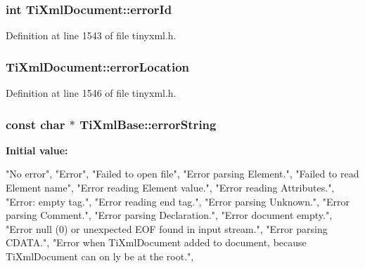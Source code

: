 \hypertarget{classTiXmlDocument_acdef97a4bb80729ac6863dd54cee7eeb}{
\subsubsection[{errorId}]{\setlength{\rightskip}{0pt plus 5cm}int {\bf TiXmlDocument::errorId}}}
\label{df/d09/classTiXmlDocument_acdef97a4bb80729ac6863dd54cee7eeb}


Definition at line 1543 of file tinyxml.h.

\hypertarget{classTiXmlDocument_aa4030f989f1549f6b897147fc2851d1a}{
\subsubsection[{errorLocation}]{ {\bf TiXmlDocument::errorLocation}}}
\label{df/d09/classTiXmlDocument_aa4030f989f1549f6b897147fc2851d1a}


Definition at line 1546 of file tinyxml.h.

\hypertarget{classTiXmlBase_a7ac8feec4100e446b3d78e1ac0659700}{
\subsubsection[{errorString}]{\setlength{\rightskip}{0pt plus 5cm}const char $\ast$ {\bf TiXmlBase::errorString}}}
\label{d8/d47/classTiXmlBase_a7ac8feec4100e446b3d78e1ac0659700}
{\bfseries Initial value:}
\begin{DoxyCode}

{
        "No error",
        "Error",
        "Failed to open file",
        "Error parsing Element.",
        "Failed to read Element name",
        "Error reading Element value.",
        "Error reading Attributes.",
        "Error: empty tag.",
        "Error reading end tag.",
        "Error parsing Unknown.",
        "Error parsing Comment.",
        "Error parsing Declaration.",
        "Error document empty.",
        "Error null (0) or unexpected EOF found in input stream.",
        "Error parsing CDATA.",
        "Error when TiXmlDocument added to document, because TiXmlDocument can on
      ly be at the root.",
}
\end{DoxyCode}


